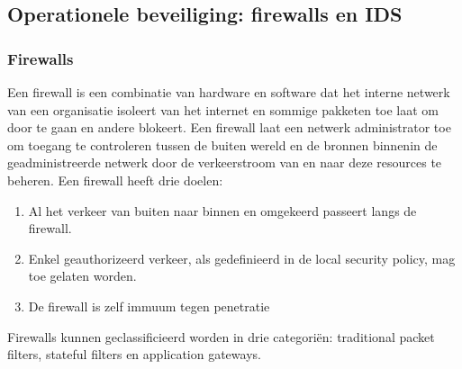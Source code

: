 \subsection{Operationele beveiliging: firewalls en IDS}

\subsubsection{Firewalls}

Een firewall is een combinatie van hardware en software dat het interne netwerk van een organisatie isoleert van het internet en sommige pakketen toe laat om door te gaan en andere blokeert. Een firewall laat een netwerk administrator toe om toegang te controleren tussen de buiten wereld en de bronnen binnenin de geadministreerde netwerk door de verkeerstroom van en naar deze resources te beheren. Een firewall heeft drie doelen:
\begin{enumerate}
\item Al het verkeer van buiten naar binnen en omgekeerd passeert langs de firewall.
\item Enkel geauthorizeerd verkeer, als gedefinieerd in de local security policy, mag toe gelaten worden.
\item De firewall is zelf immuum tegen penetratie
\end{enumerate}
Firewalls kunnen geclassificieerd worden in drie categoriën: traditional packet filters, stateful filters en application gateways.

\clearpage


